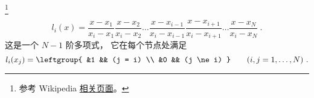 

\footnote{参考 Wikipedia \href{https://en.wikipedia.org/wiki/Lagrange_polynomial}{相关页面}。}

\begin{equation}
l_i(x) = \frac{x-x_1}{x_i-x_1} \frac{x-x_2}{x_i-x_2}  \dots \frac{x-x_{i-1}}{x_i-x_{i-1}}\frac{x-x_{i+1}}{x_i-x_{i+1}} \dots \frac{x-x_N}{x_i-x_N}~.
\end{equation}
这是一个 $N-1$ 阶多项式， 它在每个节点处满足
\begin{equation}
l_i(x_j) = \leftgroup{
&1 && (j = i) \\
&0 && (j \ne i)
} \qquad (i,j=1,\dots,N)~.
\end{equation}
